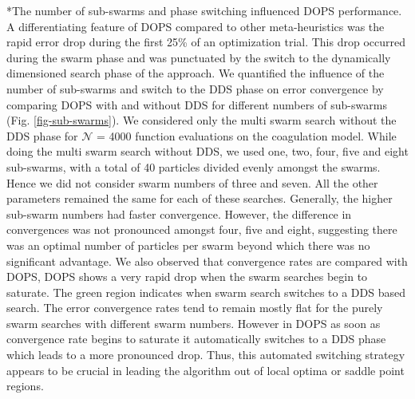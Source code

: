 \documentclass[12pt]{article}
\makeatletter
\renewcommand\subsection{\@startsection
	{subsection}{2}{0mm}
	{-0.05in}
	{-0.5\baselineskip}
	{\normalfont\normalsize\bfseries}}
\makeatother
\begin{document}
\subsection*{The number of sub-swarms and phase switching influenced DOPS performance.}
A differentiating feature of DOPS compared to other meta-heuristics was the rapid error drop during the first 25\% of an optimization trial.
This drop occurred during the swarm phase and was punctuated by the switch to the dynamically dimensioned search phase of the approach.
We quantified the influence of the number of sub-swarms and switch to the DDS phase on error convergence by comparing DOPS with and without DDS for different numbers of sub-swarms (Fig. \ref{fig-sub-swarms}).
We considered only the multi swarm search without the DDS phase for $\mathcal{N}$ = 4000 function evaluations on the coagulation model.
While doing the multi swarm search without DDS, we used one, two, four, five and eight sub-swarms, with a total of 40 particles divided evenly amongst the swarms.
Hence we did not consider swarm numbers of three and seven.
All the other parameters remained the same for each of these searches.
Generally, the higher sub-swarm numbers had faster convergence.
However, the difference in convergences was not pronounced amongst four, five and eight, suggesting
there was an optimal number of particles per swarm beyond which there was no significant advantage.
We also observed that convergence rates are compared with DOPS, DOPS shows a very rapid drop when the swarm searches begin to saturate.
The green region indicates when swarm search switches to a DDS based search.
The error convergence rates tend to remain mostly flat for the purely swarm searches with different swarm numbers.
However in DOPS as soon as convergence rate begins to saturate it automatically switches to a DDS phase which leads to a more pronounced drop.
Thus, this automated switching strategy appears to be crucial in leading the algorithm out of local optima or saddle point regions.

\clearpage

%
\end{document}
